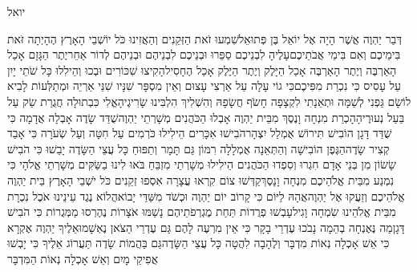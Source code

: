 \documentclass[../main/main.tex]{subfiles}
\begin{document}
\thispagestyle{empty}
\Incipit{}יואל
\cleardoublepage
\RTLmulticolcolumns
\begin{multicols*}{\ncols}
דְּבַר יַהְוֶה אֲשֶׁר הָיָה אֶל יוֹאֵל בֶּן פְּתוּאֵל\PreVerseSpace{}שִׁמְעוּ זֹאת הַזְּקֵנִים וְהַאֲזִינוּ כֹּל יוֹשְׁבֵי הָאָרֶץ הֶהָיְתָה זֹּאת בִּימֵיכֶם וְאִם בִּימֵי אֲבֹתֵיכֶם\PreVerseSpace{}עָלֶיהָ לִבְנֵיכֶם סַפֵּרוּ וּבְנֵיכֶם לִבְנֵיהֶם וּבְנֵיהֶם לְדוֹר אַחֵר\PreVerseSpace{}יֶתֶר הַגָּזָם אָכַל הָאַרְבֶּה וְיֶתֶר הָאַרְבֶּה אָכַל הַיָּלֶק וְיֶתֶר הַיֶּלֶק אָכַל הֶחָסִיל\PreVerseSpace{}הָקִיצוּ שִׁכּוֹרִים וּבְכוּ וְהֵילִלוּ כָּל שֹׁתֵי יָיִן עַל עָסִיס כִּי נִכְרַת מִפִּיכֶם\PreVerseSpace{}כִּי גוֹי עָלָה עַל אַרְצִי עָצוּם וְאֵין מִסְפָּר שִׁנָּיו שִׁנֵּי אַרְיֵה וּמְתַלְּעוֹת לָבִיא לוֹ\PreVerseSpace{}שָׂם גַּפְנִי לְשַׁמָּה וּתְאֵנָתִי לִקְצָפָה חָשֹׂף חֲשָׂפָהּ וְהִשְׁלִיךְ הִלְבִּינוּ שָׂרִיגֶיהָ\PreVerseSpace{}אֱלִי כִּבְתוּלָה חֲגֻרַת שַׂק עַל בַּעַל נְעוּרֶיהָ\PreVerseSpace{}הָכְרַת מִנְחָה וָנֶסֶךְ מִבֵּית יַהְוֶה אָבְלוּ הַכֹּהֲנִים מְשָׁרְתֵי יַהְוֶה\PreVerseSpace{}שֻׁדַּד שָׂדֶה אָבְלָה אֲדָמָה כִּי שֻׁדַּד דָּגָן הוֹבִישׁ תִּירוֹשׁ אֻמְלַל יִצְהָר\PreVerseSpace{}הֹבִישׁוּ אִכָּרִים הֵילִילוּ כֹּרְמִים עַל חִטָּה וְעַל שְׂעֹרָה כִּי אָבַד קְצִיר שָׂדֶה\PreVerseSpace{}הַגֶּפֶן הוֹבִישָׁה וְהַתְּאֵנָה אֻמְלָלָה רִמּוֹן גַּם תָּמָר וְתַפּוּחַ כָּל עֲצֵי הַשָּׂדֶה יָבֵשׁוּ כִּי הֹבִישׁ שָׂשׂוֹן מִן בְּנֵי אָדָם \ClosedSection{}חִגְרוּ וְסִפְדוּ הַכֹּהֲנִים הֵילִילוּ מְשָׁרְתֵי מִזְבֵּחַ בֹּאוּ לִינוּ בַשַּׂקִּים מְשָׁרְתֵי אֱלֹהָי כִּי נִמְנַע מִבֵּית אֱלֹהֵיכֶם מִנְחָה וָנָסֶךְ\PreVerseSpace{}קַדְּשׁוּ צוֹם קִרְאוּ עֲצָרָה אִסְפוּ זְקֵנִים כֹּל יֹשְׁבֵי הָאָרֶץ בֵּית יַהְוֶה אֱלֹהֵיכֶם וְזַעֲקוּ אֶל יַהְוֶה\PreVerseSpace{}אֲהָהּ לַיּוֹם כִּי קָרוֹב יוֹם יַהְוֶה וּכְשֹׁד מִשַּׁדַּי יָבוֹא\PreVerseSpace{}הֲלוֹא נֶגֶד עֵינֵינוּ אֹכֶל נִכְרָת מִבֵּית אֱלֹהֵינוּ שִׂמְחָה וָגִיל\PreVerseSpace{}עָבְשׁוּ פְרֻדוֹת תַּחַת מֶגְרְפֹתֵיהֶם נָשַׁמּוּ אֹצָרוֹת נֶהֶרְסוּ מַמְּגֻרוֹת כִּי הֹבִישׁ דָּגָן\PreVerseSpace{}מַה נֶּאֶנְחָה בְהֵמָה נָבֹכוּ עֶדְרֵי בָקָר כִּי אֵין מִרְעֶה לָהֶם גַּם עֶדְרֵי הַצֹּאן נֶאְשָׁמוּ\PreVerseSpace{}אֵלֶיךָ יַהְוֶה אֶקְרָא כִּי אֵשׁ אָכְלָה נְאוֹת מִדְבָּר וְלֶהָבָה לִהֲטָה כָּל עֲצֵי הַשָּׂדֶה\PreVerseSpace{}גַּם בַּהֲמוֹת שָׂדֶה תַּעֲרוֹג אֵלֶיךָ כִּי יָבְשׁוּ אֲפִיקֵי מָיִם וְאֵשׁ אָכְלָה נְאוֹת הַמִּדְבָּר\OpenSection{}\par

\end{multicols*}
\end{document}
